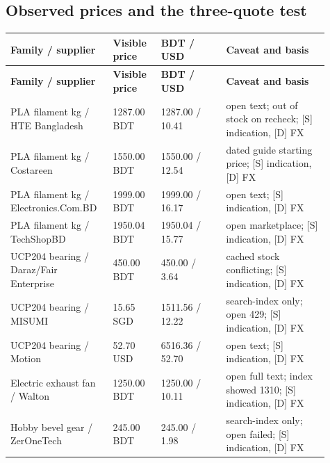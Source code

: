 \documentclass[11pt,a4paper]{article}
\begin{document}
\subsection{Observed prices and the three-quote test}
{\footnotesize
\setlength{\tabcolsep}{3pt}\renewcommand{\arraystretch}{1.18}
\begin{longtable}{@{}>{\raggedright\arraybackslash}p{0.2650\linewidth}>{\raggedright\arraybackslash}p{0.1414\linewidth}>{\raggedright\arraybackslash}p{0.1944\linewidth}>{\raggedright\arraybackslash}p{0.3092\linewidth}@{}}
\toprule \textbf{Family / supplier} & \textbf{Visible price} & \textbf{BDT / USD} & \textbf{Caveat and basis} \\ \midrule
\endfirsthead\toprule \textbf{Family / supplier} & \textbf{Visible price} & \textbf{BDT / USD} & \textbf{Caveat and basis} \\ \midrule
\endhead\bottomrule\endfoot
PLA filament kg / HTE Bangladesh & \num{1287.00} BDT & \num{1287.00} / \num{10.41} & open text; out of stock on recheck; [S] indication, [D] FX \cite{filament3} \\
PLA filament kg / Costareen & \num{1550.00} BDT & \num{1550.00} / \num{12.54} & dated guide starting price; [S] indication, [D] FX \cite{filament1} \\
PLA filament kg / Electronics.Com.BD & \num{1999.00} BDT & \num{1999.00} / \num{16.17} & open text; [S] indication, [D] FX \cite{filament4} \\
PLA filament kg / TechShopBD & \num{1950.04} BDT & \num{1950.04} / \num{15.77} & open marketplace; [S] indication, [D] FX \cite{filament2} \\
UCP204 bearing / Daraz/Fair Enterprise & \num{450.00} BDT & \num{450.00} / \num{3.64} & cached stock conflicting; [S] indication, [D] FX \cite{bearing1} \\
UCP204 bearing / MISUMI & \num{15.65} SGD & \num{1511.56} / \num{12.22} & search-index only; open 429; [S] indication, [D] FX \cite{bearing2} \\
UCP204 bearing / Motion & \num{52.70} USD & \num{6516.36} / \num{52.70} & open text; [S] indication, [D] FX \cite{bearing3} \\
Electric exhaust fan / Walton & \num{1250.00} BDT & \num{1250.00} / \num{10.11} & open full text; index showed 1310; [S] indication, [D] FX \cite{fanweb} \\
Hobby bevel gear / ZerOneTech & \num{245.00} BDT & \num{245.00} / \num{1.98} & search-index only; open failed; [S] indication, [D] FX \cite{gear} \\

\end{longtable}}
\end{document}
